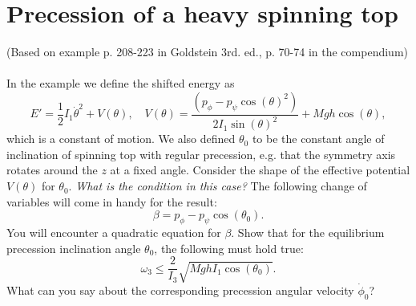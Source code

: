 \documentclass{article}
\begin{document}
    \section{Precession of a heavy spinning top}
    (Based on example p. 208-223 in Goldstein 3rd. ed., p. 70-74 in the compendium)\\ \\
    In the example we define the shifted energy as 
    \begin{equation*}
        E' = \frac{1}{2}I_1 \dot \theta^2 + V(\theta), \quad V(\theta) = \frac{(p_\phi - p_\psi \cos(\theta)^2)}{2I_1\sin(\theta)^2} + Mgh\cos(\theta),
    \end{equation*}
    which is a constant of motion. We also defined $\theta_0$ to be the constant angle of inclination of spinning top with regular precession, e.g. that the symmetry axis rotates around the $z$ at a fixed angle. Consider the shape of the effective potential $V(\theta)$ for $\theta_0$. \emph{What is the condition in this case?} The following change of variables will come in handy for the result:
    \begin{equation*}
        \beta = p_\phi - p_\psi \cos(\theta_0).
    \end{equation*}
    You will encounter a quadratic equation for $\beta$. Show that for the equilibrium precession inclination angle $\theta_0$, the following must hold true:
    \begin{equation*}
        \omega_3 \le \frac{2}{I_3}\sqrt{MghI_1 \cos(\theta_0) }.
    \end{equation*}
    What can you say about the corresponding precession angular velocity $\dot \phi_0$?
\end{document}
